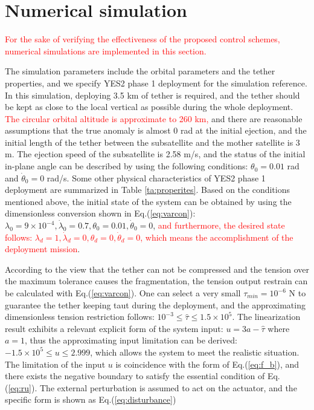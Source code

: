 \documentclass[3p]{elsarticle}
\theoremstyle{plain}
\begin{document}
\section{Numerical simulation}\label{sec:sm}
\textcolor{red}{For the sake of verifying the effectiveness of the proposed control schemes, numerical simulations are implemented in this section.}\par
The simulation parameters include the orbital parameters and the tether properties, and we specify YES2 phase 1 deployment for the simulation reference. In this simulation, deploying 3.5 km of tether is required, and the tether should be kept as close to the local vertical as possible during the whole deployment. \textcolor{red}{The circular orbital altitude is approximate to 260 km,} and there are reasonable assumptions that the true anomaly is almost 0 rad at the initial ejection, and the initial length of the tether between the subsatellite and the mother satellite is 3 m. The ejection speed of the subsatellite is 2.58 m/s, and the status of the initial in-plane angle can be described by using the following conditions: $\theta_0=0.01$ rad  and $\dot\theta_0 = 0$ rad/s. Some other physical characteristics of YES2 phase 1 deployment are summarized in Table \ref{ta:properites}. Based on the conditions mentioned above, the initial state of the system can be obtained by using the dimensionless conversion shown in Eq.(\ref{eq:varcon}): $\lambda_0 =9\times 10^{-4},\dot\lambda_0=0.7,\theta_0 = 0.01,\dot\theta_0=0$, \textcolor{red}{and furthermore, the desired state follows: $\lambda_d =1,\dot\lambda_d=0,\theta_d = 0,\dot\theta_d=0$, which means the accomplishment of the deployment mission}.\par
According to the view that the tether can not be compressed and the tension over the maximum tolerance causes the fragmentation, the tension output restrain can be calculated with Eq.(\ref{eq:varcon}). One can select a very small $\tau_{min} = 10^{-6}$ N to guarantee the tether keeping taut during the deployment, and the approximating dimensionless tension restriction follows: $10^{-3}\le\hat{\tau}\le 1.5\times 10^5$. The linearization result exhibits a relevant explicit form of the system input: $u = 3a - \hat{\tau}$ where $a=1$, thus the approximating input limitation can be derived: $-1.5\times 10^5\le u\le2.999$, which allows the system to meet the realistic situation. The limitation of the input $u$ is coincidence with the form of Eq.(\ref{eq:f_b}), and there exists the negative boundary to satisfy the essential condition of Eq.(\ref{eq:ru}). The external perturbation is assumed to act on the actuator, and the specific form is shown as Eq.(\ref{eq:disturbance}) \par
\end{document}

